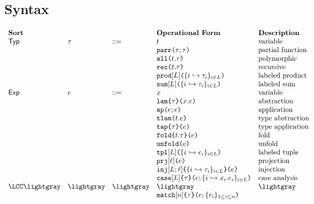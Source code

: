 \subsection{Syntax}
\[\begin{array}{lllllll}
\textbf{Sort} & & 
& \textbf{Operational Form} 
& \textbf{Description}\\
\mathsf{Typ} & \tau & ::= & t 
& \text{variable}\\
&&& \aparr{\tau}{\tau} 
& \text{partial function}\\
&&& \aall{t}{\tau} 
& \text{polymorphic}\\
&&& \arec{t}{\tau} 
& \text{recursive}\\
&&& \aprod{\labelset}{\mapschema{\tau}{i}{\labelset}} 
& \text{labeled product}\\
&&& \asum{\labelset}{\mapschema{\tau}{i}{\labelset}} 
& \text{labeled sum}\\
\mathsf{Exp} & e & ::= & x 
& \text{variable}\\
&&& \aelam{\tau}{x}{e} 
& \text{abstraction}\\
&&& \aeap{e}{e} 
& \text{application}\\
&&& \aetlam{t}{e} 
& \text{type abstraction}\\
&&& \aetap{e}{\tau} 
& \text{type application}\\
&&& \aefold{t}{\tau}{e} 
& \text{fold}\\
&&& \aeunfold{e} 
& \text{unfold}\\
&&& \aetpl{\labelset}{\mapschema{e}{i}{\labelset}} 
& \text{labeled tuple}\\
&&& \aepr{\ell}{e} 
& \text{projection}\\
&&& \aein{\labelset}{\ell}{\mapschema{\tau}{i}{\labelset}}{e} 
& \text{injection}\\
&&& \aecase{\labelset}{\tau}{e}{\mapschemab{x}{e}{i}{\labelset}} 
& \text{case analysis}\\
\LCC \lightgray & \lightgray & \lightgray 
& \lightgray & \lightgray \\
&&
& \aematchwith{n}{\tau}{e}{\seqschemaX{r}}

\end{array}\]

